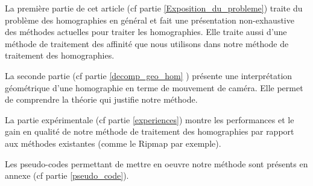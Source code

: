 	La première partie de cet article (cf partie \ref{Exposition_du_probleme}) traite du problème des homographies en général et fait une présentation non-exhaustive des méthodes actuelles pour traiter les homographies. Elle traite aussi d'une méthode de traitement des affinité que nous utilisons dans notre méthode de traitement des homographies.

	La seconde partie (cf partie \ref{decomp_geo_hom} ) présente une interprétation géométrique d'une homographie en terme de mouvement de caméra. Elle permet de comprendre la théorie qui justifie notre méthode.

	La partie expérimentale (cf partie \ref{experiences}) montre les performances et le gain en qualité de notre méthode de traitement des homographies par rapport aux méthodes existantes (comme le Ripmap par exemple).

	Les pseudo-codes permettant de mettre en oeuvre notre méthode sont présents en annexe (cf partie \ref{pseudo_code}).

